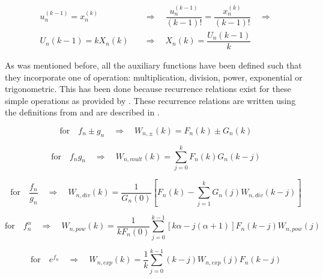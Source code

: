 \begin{equation} \label{eq:UnXn}
\begin{split}
u_{n}^{\left( k-1\right)}=x_{n}^{\left( k\right)} \quad &\Rightarrow \quad \dfrac{u_{n}^{\left( k-1\right)}}{\left(k-1\right)!} = \dfrac{x_{n}^{\left( k\right)}}{\left(k-1\right)!} \quad \Rightarrow\\
U_{n}\left(k-1\right)=kX_{n}\left(k\right) \quad &\Rightarrow \quad X_{n}\left(k\right)=\dfrac{U_{n}\left(k-1\right)}{k}
\end{split}
\end{equation}

As was mentioned before, all the auxiliary functions have been defined such that they incorporate one of operation: multiplication, division, power, exponential or trigonometric. This has been done because recurrence relations exist for these simple operations as provided by \cite{jorba2005software}. These recurrence relations are written using the definitions from  and are described in .

\begin{equation} \label{eq:recRel1}
\text{for} \quad f_{n} \pm g_{n} \quad \Rightarrow \quad W_{n,\pm}\left(k\right)= F_{n}\left(k\right) \pm G_{n}\left(k\right)
\end{equation}

\begin{equation} \label{eq:recRel2}
\text{for} \quad f_{n}g_{n} \quad \Rightarrow \quad W_{n,mult}\left(k\right)=\displaystyle\sum_{j=0}^{k}F_{n}\left(k\right)G_{n}\left(k-j\right)
\end{equation}

\begin{equation} \label{eq:recRel3}
\text{for} \quad \dfrac{f_{n}}{g_{n}} \quad \Rightarrow \quad W_{n,div}\left(k\right)= \dfrac{1}{G_{n}\left(0\right)}\left[F_{n}\left(k\right)-\displaystyle\sum_{j=1}^{k}G_{n}\left(j\right)W_{n,div}\left(k-j\right) \right]
\end{equation}

\begin{equation} \label{eq:recRel4}
\text{for} \quad f_{n}^{\alpha} \quad \Rightarrow \quad W_{n,pow}\left(k\right)= \dfrac{1}{kF_{n}\left(0\right)} \displaystyle\sum_{j=0}^{k-1}\left[k\alpha-j\left(\alpha+1\right)\right] F_{n}\left(k-j\right)W_{n,pow}\left(j\right) 
\end{equation}

\begin{equation} \label{eq:recRel5}
\text{for} \quad e^{f_{n}} \quad \Rightarrow \quad W_{n,exp}\left(k\right)= \dfrac{1}{k}\displaystyle\sum_{j=0}^{k-1}\left(k-j\right)W_{n,exp}\left(j\right)F_{n}\left(k-j\right)
\end{equation}

